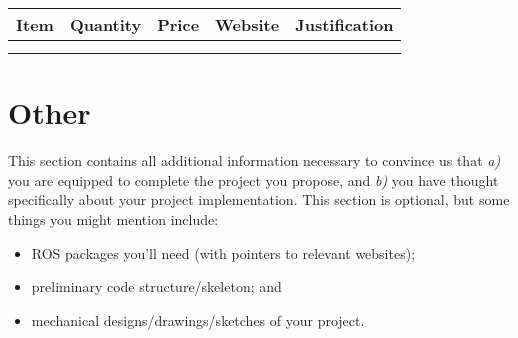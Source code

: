 \documentclass[letterpaper]{article}
\begin{document}
\vspace{1em}

\begin{tabular}[h]{l|l|l|l|l}
\textbf{Item} & \textbf{Quantity} & \textbf{Price} & \textbf{Website} & \textbf{Justification} \\
\hline
 & & & & \\
 & & & & \\
\end{tabular}

\section{Other}

This section contains all additional information necessary to convince us that \textit{a)} you are equipped to complete the project you propose, and \textit{b)} you have thought specifically about your project implementation. This section is optional, but some things you might mention include:

\begin{itemize}
\item ROS packages you'll need (with pointers to relevant websites); 
\item preliminary code structure/skeleton; and 
\item mechanical designs/drawings/sketches of your project.
\end{itemize}
\end{document}
